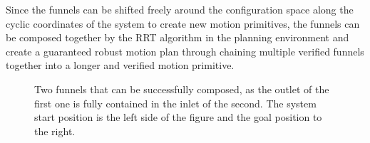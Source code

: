
Since the funnels can be shifted freely around the configuration space along the
cyclic coordinates of the system to create new motion primitives, the funnels
can be composed together by the RRT algorithm in the planning environment and
create a guaranteed robust motion plan through chaining multiple verified
funnels together into a longer and verified motion primitive.

\begin{figure}[!t]
  \caption[Two composable funnels]{Two funnels that can be successfully composed, as the outlet of the
    first one is fully contained in the inlet of the second.
    The system start position is the left side of the figure and the goal position to the right.}
  \label{fig:two-funnels-composed}
\end{figure}

